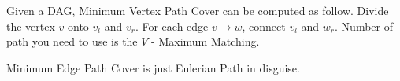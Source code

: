 Given a DAG, Minimum Vertex Path Cover can be computed as follow.
Divide the vertex $v$ onto $v_l$ and $v_r$. For each edge $v \rightarrow w$, connect $v_l$ and $w_r$.
Number of path you need to use is the $V$ - Maximum Matching.

Minimum Edge Path Cover is just Eulerian Path in disguise.